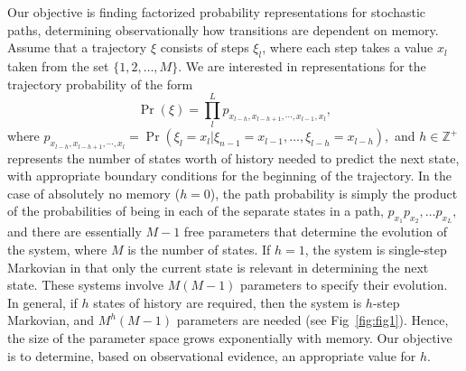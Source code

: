 \documentclass[prl,twocolumn,groupedaddress]{revtex4-1}
\renewcommand{\bf}[1]{\textbf{#1}}
\begin{document}
 Our objective is finding factorized probability representations for stochastic paths, determining observationally how transitions  are  dependent on memory. Assume that a trajectory $\xi$ consists of steps $\xi_l$, where each step takes  a value $x_l$ taken from the set $\{1,2,\ldots,M\}.$ We are interested in representations for the trajectory probability of the  form
%
\begin{equation}
\Pr(\xi) = \prod_{l}^L p_{x_{l-h},x_{l-h+1},\cdots,x_{l-1},x_l}, 
\label{eq:factorize}
\end{equation}
%
where $p_{x_{l-h},x_{l-h+1},\cdots,x_l} =  \Pr(\xi_l = x_l | \xi_{n-1} = x_{l-1}, \ldots, \xi_{l-h} = x_{l-h} ),$ and $h\in\mathbb{Z}^+$ represents the number of states worth of history needed to predict the next state, with appropriate boundary conditions for the beginning of the trajectory. In the case of absolutely no memory ($h=0$), the path probability is simply the product of the probabilities of being in each of the separate states in a path, $p_{x_1}p_{x_2},\ldots p_{x_L},$ and there are essentially $M-1$ free parameters that determine the evolution of the system, where $M$ is the number of states. If $h=1$, the system is single-step Markovian in that only the current state is relevant in determining the next state. These systems involve $M(M-1)$ parameters to specify their evolution. In general, if $h$ states of history are required, then the system is $h$-step Markovian, and $M^h(M-1)$ parameters are needed (see Fig~\ref{fig:fig1}). Hence, the size of the parameter space grows exponentially with memory. Our objective is to determine, based on observational evidence, an appropriate value for $h$. 

 
 
\end{document}
